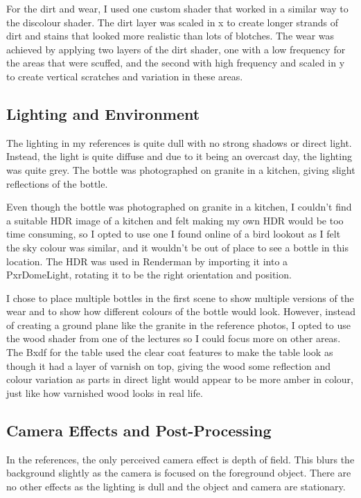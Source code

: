 \documentclass[notitlepage,12pt]{article}
\begin{document}
For the dirt and wear, I used one custom shader that worked in a similar way to the discolour shader. The dirt layer was scaled in x to create longer strands of dirt and stains that looked more realistic than lots of blotches. The wear was achieved by applying two layers of the dirt shader, one with a low frequency for the areas that were scuffed, and the second with high frequency and scaled in y to create vertical scratches and variation in these areas.

\subsection{Lighting and Environment}

The lighting in my references is quite dull with no strong shadows or direct light. Instead, the light is quite diffuse and due to it being an overcast day, the lighting was quite grey. The bottle was photographed on granite in a kitchen, giving slight reflections of the bottle.

Even though the bottle was photographed on granite in a kitchen, I couldn't find a suitable HDR image of a kitchen and felt making my own HDR would be too time consuming, so I opted to use one I found online of a bird lookout as I felt the sky colour was similar, and it wouldn't be out of place to see a bottle in this location. The HDR was used in Renderman by importing it into a PxrDomeLight, rotating it to be the right orientation and position.

I chose to place multiple bottles in the first scene to show multiple versions of the wear and to show how different colours of the bottle would look. However, instead of creating a ground plane like the granite in the reference photos, I opted to use the wood shader from one of the lectures so I could focus more on other areas. The Bxdf for the table used the clear coat features to make the table look as though it had a layer of varnish on top, giving the wood some reflection and colour variation as parts in direct light would appear to be more amber in colour, just like how varnished wood looks in real life.

\subsection{Camera Effects and Post-Processing}

In the references, the only perceived camera effect is depth of field. This blurs the background slightly as the camera is focused on the foreground object. There are no other effects as the lighting is dull and the object and camera are stationary.
\end{document}
